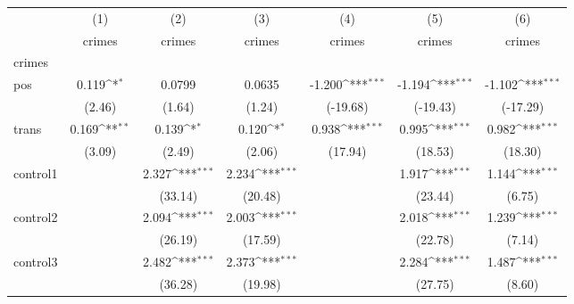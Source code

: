 {
\def\sym#1{\ifmmode^{#1}\else\(^{#1}\)\fi}
\begin{tabular}{l*{6}{c}}
\hline\hline
            &\multicolumn{1}{c}{(1)}&\multicolumn{1}{c}{(2)}&\multicolumn{1}{c}{(3)}&\multicolumn{1}{c}{(4)}&\multicolumn{1}{c}{(5)}&\multicolumn{1}{c}{(6)}\\
            &\multicolumn{1}{c}{crimes}&\multicolumn{1}{c}{crimes}&\multicolumn{1}{c}{crimes}&\multicolumn{1}{c}{crimes}&\multicolumn{1}{c}{crimes}&\multicolumn{1}{c}{crimes}\\
\hline
crimes      &                     &                     &                     &                     &                     &                     \\
pos         &       0.119\sym{*}  &      0.0799         &      0.0635         &      -1.200\sym{***}&      -1.194\sym{***}&      -1.102\sym{***}\\
            &      (2.46)         &      (1.64)         &      (1.24)         &    (-19.68)         &    (-19.43)         &    (-17.29)         \\
[1em]
trans       &       0.169\sym{**} &       0.139\sym{*}  &       0.120\sym{*}  &       0.938\sym{***}&       0.995\sym{***}&       0.982\sym{***}\\
            &      (3.09)         &      (2.49)         &      (2.06)         &     (17.94)         &     (18.53)         &     (18.30)         \\
[1em]
control1    &                     &       2.327\sym{***}&       2.234\sym{***}&                     &       1.917\sym{***}&       1.144\sym{***}\\
            &                     &     (33.14)         &     (20.48)         &                     &     (23.44)         &      (6.75)         \\
[1em]
control2    &                     &       2.094\sym{***}&       2.003\sym{***}&                     &       2.018\sym{***}&       1.239\sym{***}\\
            &                     &     (26.19)         &     (17.59)         &                     &     (22.78)         &      (7.14)         \\
[1em]
control3    &                     &       2.482\sym{***}&       2.373\sym{***}&                     &       2.284\sym{***}&       1.487\sym{***}\\
            &                     &     (36.28)         &     (19.98)         &                     &     (27.75)         &      (8.60)         \\

\end{tabular}}
